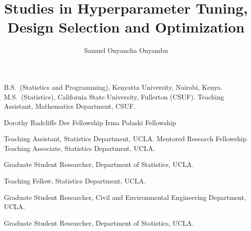 


\title {Studies in Hyperparameter Tuning, Design Selection and Optimization}

\author{Samuel Onyancha Onyambu}








\dedication{\textsl{To my parents, Joseph and Jane, ---\\  
          my siblings, Tabitha, Naomi, Jasper, and Lilian,---\\  
          and my dear friends, Taylor and Justin,---\\  
          who among so many other things ensured that I gave my all to accomplish this task.}
}


                {B.S.~(Statistics and Programming), Kenyatta University, Nairobi, Kenya.}
                {M.S.~(Statistics), California State University, Fullerton (CSUF).}
                {Teaching Assistant, Mathematics Department, CSUF.}

  {Dorothy Radcliffe Dee Fellowship}
   {Irma Polaski Fellowship}


               {Teaching Assistant, Statistics Department, UCLA.}
 {Mentored Research Fellowship}
               {Teaching Associate, Statistics Department, UCLA.} 

                {Graduate Student Researcher, Department of Statistics, UCLA.}

 {Teaching Fellow, Statistics Department, UCLA.} 

                {Graduate Student Researcher, Civil and Environmental Engineering Department, UCLA.}

                {Graduate Student Researcher, Department of Statistics, UCLA.}


\clearpage





